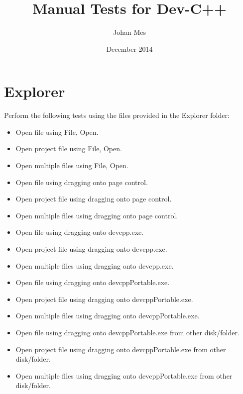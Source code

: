 \documentclass{article}
\title{Manual Tests for Dev-C++}
\author{Johan Mes}
\date{December 2014}
\begin{document}
\maketitle

\clearpage
\section{Explorer}
Perform the following tests using the files provided in the Explorer folder:
\begin{itemize}
    \item Open file using File, Open.
    \item Open project file using File, Open.
    \item Open multiple files using File, Open.
    
    \item Open file using dragging onto page control.
    \item Open project file using dragging onto page control.
    \item Open multiple files using dragging onto page control.
    
    \item Open file using dragging onto devcpp.exe.
    \item Open project file using dragging onto devcpp.exe.
    \item Open multiple files using dragging onto devcpp.exe.
    
    \item Open file using dragging onto devcppPortable.exe.
    \item Open project file using dragging onto devcppPortable.exe.
    \item Open multiple files using dragging onto devcppPortable.exe.
    
    \item Open file using dragging onto devcppPortable.exe from other disk/folder.
    \item Open project file using dragging onto devcppPortable.exe from other disk/folder.
    \item Open multiple files using dragging onto devcppPortable.exe from other disk/folder.
\end{itemize}

\clearpage
\end{document}
